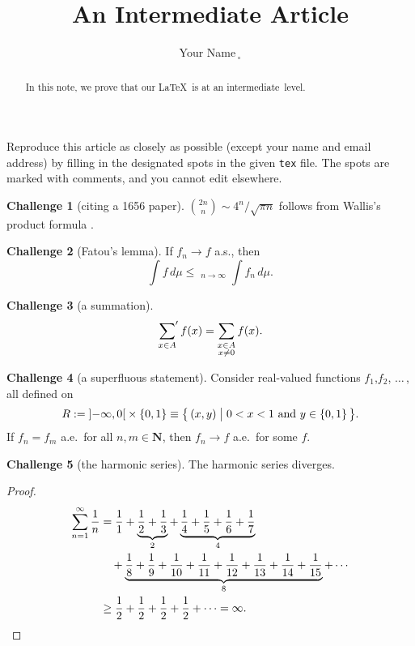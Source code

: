\documentclass[11pt]{amsart}
\theoremstyle{definition}
\newtheorem{challenge}{Challenge}
\newcommand{\R}{\mathbf{R}}
\DeclareMathOperator*{\barliminf}{\underline{lim}}
\begin{document}
\title{An Intermediate Article}
\author{Your Name$\,_\circ$} %
\address{KAIST, 291 Daehak-ro, Yuseong-gu, Daejeon 34141, Republic of Korea}
\begin{abstract}
In this note, we prove that our \LaTeX\ is at an \mbox{intermediate level.}
\end{abstract}

\maketitle

Reproduce this article as closely as possible (except your name and
email address) by filling in the designated spots in the given
\texttt{tex} file.
The spots are marked with comments, and you cannot edit elsewhere.

\begin{challenge}[citing a 1656 paper]
$\binom{2n}{n} \sim 4^n/\sqrt{\pi n}$ follows from
Wallis's product formula \cite{Wallis}.
\end{challenge}

\begin{challenge}[Fatou's lemma]
If $f_n \to f$ a.s., then
\[ \int f \,d\mu \le \barliminf_{n\to\infty} \int f_n \,d\mu. \]
\end{challenge}

\begin{challenge}[a summation]
\[
\sideset{}{'}\sum_{x\in A} f(x) =
\sum_{\substack{x\in A \\ x\ne 0}} f(x).
\]
\end{challenge}

\begin{challenge}[a superfluous statement]
Consider real-valued functions $f_1$,$f_2$, $\ldots\,$, all defined on
\[
R := \left]-\infty,0\right[ \times \{0,1\} \equiv
\bigl\{\,(x,y) \bigm| 0 < x < 1 \text{ and } y \in \{0,1\}\,\bigr\}.
\]
If $f_n = f_m$ a.e.\ for all $n,m \in \mathbf{N}$, then $f_n \to f$ a.e.\
for some $f$.
\end{challenge}

\begin{challenge}[the harmonic series] The harmonic series diverges.
\begin{proof}
\[
\begin{split}
\sum_{n=1}^\infty \frac{1}{n} &=
\frac{1}{1} + \underbrace{\frac{1}{2} + \frac{1}{3}}_2 +
\underbrace{\frac{1}{4} + \frac{1}{5} + \frac{1}{6} + \frac{1}{7}}_4 \\
&\quad + \underbrace{\frac{1}{8} + \frac{1}{9} + \frac{1}{10} + \frac{1}{11}
+ \frac{1}{12} + \frac{1}{13} + \frac{1}{14} + \frac{1}{15}}_8 + \cdots \\
&\ge \frac{1}{2} + \frac{1}{2} + \frac{1}{2} + \frac{1}{2} + \cdots = \infty.
\qedhere
\end{split}
\]
\end{proof}
\end{challenge}
\end{document}
